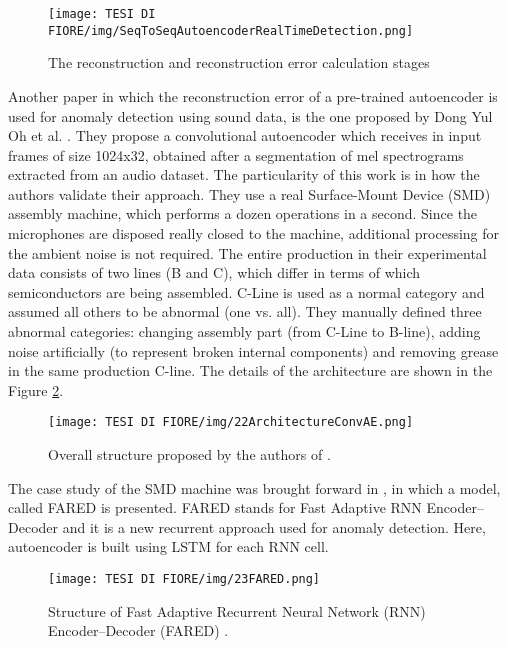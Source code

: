 \begin{figure}[ht]
\texttt{[image: TESI DI FIORE/img/SeqToSeqAutoencoderRealTimeDetection.png]}
\centering
\caption{The reconstruction and reconstruction error calculation stages \cite{13RealTimeDetectionUsingSequentialAutoencoder}}
\label{seq2seq-architecture-realtime}
\end{figure}

Another paper in which the reconstruction error of a pre-trained autoencoder is used for anomaly detection using sound data, is the one proposed by Dong Yul Oh et al. \cite{22SMDMachineResidualError}. They propose a convolutional autoencoder which receives in input frames of size 1024x32, obtained after a segmentation of mel spectrograms extracted from an audio dataset. The particularity of this work is in how the authors validate their approach. They use a real Surface-Mount Device (SMD) assembly machine, which performs a dozen operations in a second. Since the microphones are disposed really closed to the machine, additional processing for the ambient noise is not required. The entire production in their experimental data consists of two lines (B and C), which differ in terms of which semiconductors are being assembled. C-Line is used as a normal category and assumed all others to be abnormal (one vs. all). They manually defined three abnormal categories: changing assembly part (from C-Line to B-line), adding noise artificially (to represent broken internal components) and removing grease in the same production C-line. The details of the architecture are shown in the Figure \ref{22ConvAEArchitecture}.

\begin{figure}[ht]
\texttt{[image: TESI DI FIORE/img/22ArchitectureConvAE.png]}
\centering
\caption{Overall structure proposed by the authors of \cite{22SMDMachineResidualError}.}
\label{22ConvAEArchitecture}
\end{figure}

The case study of the SMD machine was brought forward in \cite{23SMDFared}, in which a model, called FARED is presented. FARED stands for Fast Adaptive RNN Encoder–Decoder and it is a new recurrent approach used for anomaly detection. Here, autoencoder is built using LSTM for each RNN cell.

\begin{figure}[ht]
\texttt{[image: TESI DI FIORE/img/23FARED.png]}
\centering
\caption{Structure of Fast Adaptive Recurrent Neural Network (RNN) Encoder–Decoder (FARED) \cite{23SMDFared}.}
\label{23FARED}
\end{figure}

